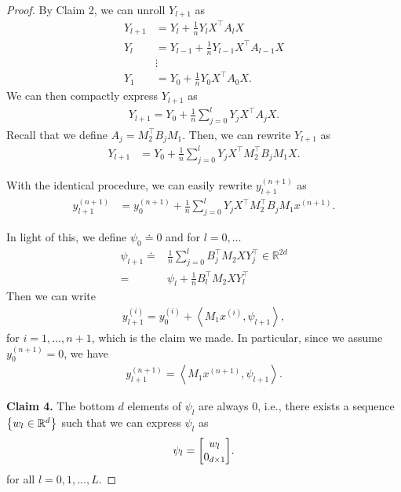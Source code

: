 \documentclass{article}
\newcommand{\R}{\mathbb{R}}
\newcommand{\indot}[2]{{\left<#1, #2\right>}}
\begin{document}
\begin{proof}
    By Claim 2, we can unroll $Y_{l+1}$ as
    \begin{align}
        Y_{l+1} &= Y_l + \frac{1}{n} Y_l X^\top A_l X\\
        Y_l &= Y_{l-1} + \frac{1}{n} Y_{l-1} X^\top A_{l-1} X\\
         &\vdots\\
        Y_1 & = Y_0 + \frac{1}{n} Y_0 X^\top A_0 X.
    \end{align}
    We can then compactly express $Y_{l+1}$ as
    \begin{align}
        Y_{l+1} = Y_0 + \frac{1}{n}\sum_{j=0}^l Y_j X^\top A_j X.
    \end{align}
    Recall that we define $A_j = M_2^\top B_j M_1$.
    Then, we can rewrite $Y_{l+1}$ as
    \begin{align}
        Y_{l+1} 
        &= Y_0 + \frac{1}{n} \sum_{j=0}^l Y_j X^\top M_2^\top B_j M_1 X.
    \end{align}
  
    With the identical procedure, we can easily rewrite $y_{l+1}^{(n+1)}$ as
    \begin{align}
        y_{l+1}^{(n+1)} &= y_0^{(n+1)} + \frac{1}{n} \sum_{j=0}^l Y_j X^\top M_2^\top B_j M_1 x^{(n+1)}.
    \end{align}
    
    
    In light of this,
    we define $\psi_0 \doteq 0$ and for $l = 0, \dots$
    \begin{align}
      \psi_{l+1}
      \doteq & \frac{1}{n}\sum_{j=0}^l B_j^\top M_2 X Y_j^\top \in \R^{2d}\\
      = & \psi_l + \frac{1}{n} B_l^\top M_2 X Y_l^\top \label{eq: true RG psi evol}
    \end{align}
    Then we can write
    \begin{align}
        y_{l+1}^{(i)} = y_0^{(i)} + \indot{M_1 x^{(i)}}{\psi_{l+1}}, \label{eq: y_l+1 evol psi true RG}
    \end{align}
    for $i=1, \dots, n+1$, which is the claim we made.
    In particular, since we assume $y_0^{(n+1)} = 0$, we have
    \begin{align}
      y_{l+1}^{(n+1)} = \indot{M_1 x^{(n+1)}}{\psi_{l+1}}. 
    \end{align}

    \textbf{Claim 4.} The bottom $d$ elements of $\psi_l$ are always 0, i.e., there exists a sequence $\qty{w_l \in \R^d}$ such that we can express $\psi_l$ as
    \begin{align}
        \psi_l = \mqty[w_l \\ 0_{d \times 1}]. 
    \end{align}
    for all $l = 0,1,\dots, L$.


\end{proof}
\end{document}
